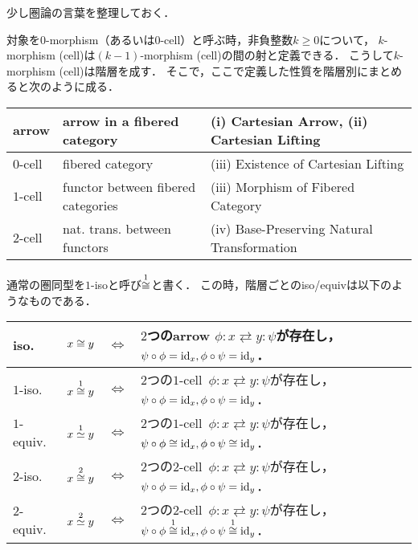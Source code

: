 \documentclass[a4paper, dvipdfmx]{jsarticle}
\begin{document}
\begin{Remark}
    少し圏論の言葉を整理しておく．

    対象を$0$-morphism（あるいは$0$-cell）と呼ぶ時，非負整数$k \geq 0$について，
    $k$-morphism (cell)は$(k-1)$-morphism (cell)の間の射と定義できる．
    こうして$k$-morphism (cell)は階層を成す．
    そこで，ここで定義した性質を階層別にまとめると次のように成る．
    \begin{center}
    \begin{tabular}{l|l|l}
        \hline
        arrow& arrow in a fibered category & (i) Cartesian Arrow, (ii) Cartesian Lifting \\ \hline\hline
        $0$-cell& fibered category & (iii) Existence of Cartesian Lifting \\ \hline
        $1$-cell& functor between fibered categories & (iii) Morphism of Fibered Category \\ \hline
        $2$-cell& nat. trans. between functors & (iv) Base-Preserving Natural Transformation \\
        \hline
    \end{tabular}
    \end{center}

    通常の圏同型を$1$-isoと呼び$\kiso[1]$と書く．
    この時，階層ごとのiso/equivは以下のようなものである．
    \begin{center}
        \begin{tabular}{lccl}
            iso. & $x \iso y$& $\iff$ &
                $2$つのarrow $\phi \colon x \rightleftarrows y \colon \psi$が存在し， 
                $\psi \circ \phi=\id[x], \phi \circ \psi=\id[y]$．\\ \hline\hline
            $1$-iso. & $x \kiso[1] y$& $\iff$ &
                $2$つの$1$-cell \,$\phi \colon x \rightleftarrows y \colon \psi$が存在し， 
                $\psi \circ \phi=\id[x], \phi \circ \psi=\id[y]$．\\
            $1$-equiv. & $x \kequiv[1] y$& $\iff$ &
                $2$つの$1$-cell \,$\phi \colon x \rightleftarrows y \colon \psi$が存在し， 
                $\psi \circ \phi \kiso \id[x], \phi \circ \psi \kiso \id[y]$．\\ \hline
            $2$-iso. & $x \kiso[2] y$& $\iff$ &
                $2$つの$2$-cell \,$\phi \colon x \rightleftarrows y \colon \psi$が存在し， 
                $\psi \circ \phi=\id[x], \phi \circ \psi=\id[y]$．\\
            $2$-equiv. & $x \kequiv[2] y$& $\iff$ &
                $2$つの$2$-cell \,$\phi \colon x \rightleftarrows y \colon \psi$が存在し， 
                $\psi \circ \phi \kiso[1] \id[x], \phi \circ \psi \kiso[1] \id[y]$．\\
        \end{tabular}
    \end{center}
\end{Remark}
\end{document}
